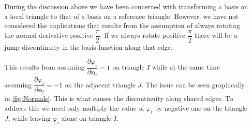 During the discussion above we have been concerned with transforming a basis on a local triangle to
that of a basis on a reference triangle. However, we have not considered the implications that
results from the assumption of always rotating the normal derivative positive $\dfrac{\pi}{2}$.
If we always rotate positive $\dfrac{\pi}{2}$ there will be a jump discontinuity in the basis
function along that edge. 

This results from assuming $\dfrac{\partial\varphi_i}{\partial\mathbf{n}_i} = 1$ on triangle $I$
while at the same time assuming $\dfrac{\partial\varphi_i}{\partial\mathbf{n}_i} = -1$ on the
adjacent triangle $J$. The issue can be seen graphically in \autoref{fig:Normals}. This is what
causes the discontinuity along shared edges. To address this we need only multiply the value of
$\varphi_i$ by negative one on the triangle $J$, while leaving $\varphi_i$ alone on triangle $I$. 




